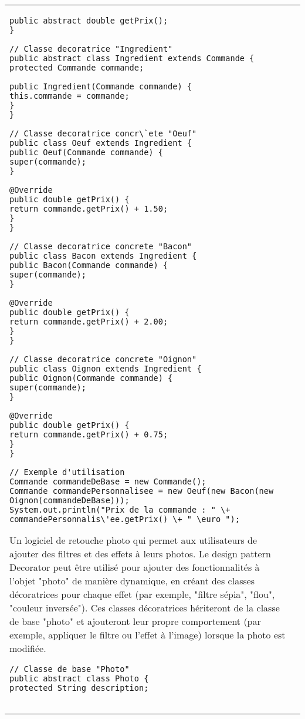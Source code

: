 \begin{table}[H]
\begin{adjustbox}{max width=\textwidth}
\begin{tabular}{l|p{\textwidth}}
\begin{minipage}[tl]{0.5\textwidth}
\begin{minipage}[b]{1\textwidth}
\begin{lstlisting}[style=monstyle]
public abstract double getPrix();
}

// Classe decoratrice "Ingredient"
public abstract class Ingredient extends Commande {
protected Commande commande;

public Ingredient(Commande commande) {
this.commande = commande;
}
}

// Classe decoratrice concr\`ete "Oeuf"
public class Oeuf extends Ingredient {
public Oeuf(Commande commande) {
super(commande);
}

@Override
public double getPrix() {
return commande.getPrix() + 1.50;
}
}

// Classe decoratrice concrete "Bacon"
public class Bacon extends Ingredient {
public Bacon(Commande commande) {
super(commande);
}

@Override
public double getPrix() {
return commande.getPrix() + 2.00;
}
}

// Classe decoratrice concrete "Oignon"
public class Oignon extends Ingredient {
public Oignon(Commande commande) {
super(commande);
}

@Override
public double getPrix() {
return commande.getPrix() + 0.75;
}
}

// Exemple d'utilisation
Commande commandeDeBase = new Commande();
Commande commandePersonnalisee = new Oeuf(new Bacon(new Oignon(commandeDeBase)));
System.out.println("Prix de la commande : " \+ commandePersonnalis\'ee.getPrix() \+ " \euro ");
\end{lstlisting}
\end{minipage}

\end{minipage}
%
%
%
\hspace{6mm}
\begin{minipage}[tr]{0.5\textwidth}
\begin{minipage}[t]{1\textwidth}
Un logiciel de retouche photo qui permet aux utilisateurs de ajouter des filtres et des effets \`a leurs photos. Le design pattern Decorator peut \^etre utilis\'e pour ajouter des fonctionnalit\'es à l'objet "photo" de mani\`ere dynamique, en cr\'eant des classes d\'ecoratrices pour chaque effet (par exemple, "filtre s\'epia", "flou", "couleur invers\'ee"). Ces classes d\'ecoratrices h\'eriteront de la classe de base "photo" et ajouteront leur propre comportement (par exemple, appliquer le filtre ou l'effet à l'image) lorsque la photo est modifi\'ee.
\end{minipage}
\begin{minipage}[b]{1\textwidth}
\begin{lstlisting}[style=monstyle]
// Classe de base "Photo"
public abstract class Photo {
protected String description;


\end{lstlisting}
\end{minipage}
\end{minipage}
\end{tabular}
\end{adjustbox}
\end{table}
